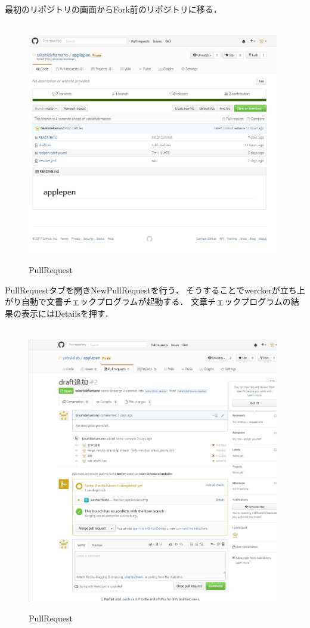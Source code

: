 \newpage
最初のリポジトリの画面からFork前のリポジトリに移る．
\begin{figure}
\centering　
\includegraphics[width=11cm]{31.JPG}
\caption{PullRequest}\label{tab:uac}
\end{figure}
\newpage
PullRequestタブを開きNewPullRequestを行う．
そうすることでwerckerが立ち上がり自動で文書チェックプログラムが起動する．
文章チェックプログラムの結果の表示にはDetailsを押す．
\begin{figure}
\centering　
\includegraphics[width=11cm]{24.JPG}
\caption{PullRequest}\label{tab:uac}
\end{figure}

